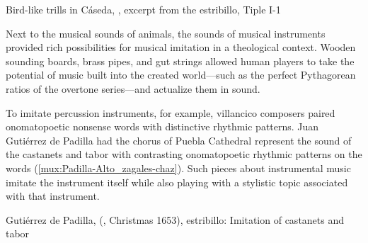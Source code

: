 {Bird-like trills in Cáseda, , excerpt from the
estribillo, Tiple I-1}

Next to the musical sounds of animals, the sounds of musical instruments
provided rich possibilities for musical imitation in a theological context.
Wooden sounding boards, brass pipes, and gut strings allowed human players to
take the potential of music built into the created world---such as the perfect
Pythagorean ratios of the overtone series---and actualize them in sound.

To imitate percussion instruments, for example, villancico composers paired
onomatopoetic nonsense words with distinctive rhythmic patterns.
Juan Gutiérrez de Padilla had the chorus of Puebla Cathedral represent the
sound of the castanets and tabor with contrasting onomatopoetic rhythmic
patterns on the words  (\cref{mux:Padilla-Alto_zagales-chaz}).
Such pieces about instrumental music imitate the instrument itself while also
playing with a stylistic topic associated with that instrument.

{Gutiérrez de Padilla, 
(, Christmas 1653), estribillo: Imitation of castanets
and tabor}

